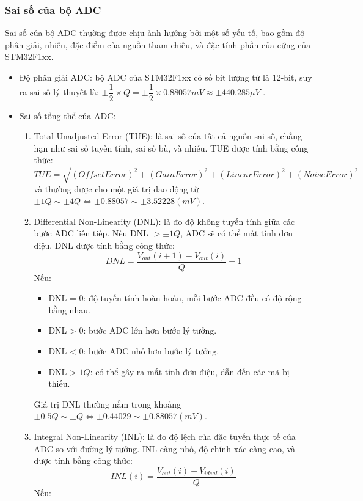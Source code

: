 \subsubsection{Sai số của bộ ADC}

Sai số của bộ ADC thường được chịu ảnh hưởng bởi một số yếu tố, bao gồm độ phân giải, nhiễu, đặc điểm của nguồn tham chiếu, và đặc tính phần của cứng của STM32F1xx.

\begin{itemize}[label=-]
	\item Độ phân giải ADC: bộ ADC của STM32F1xx có số bit lượng tử là 12-bit, suy ra sai số lý thuyết là: $\pm \dfrac{1}{2}\times Q = \pm\dfrac{1}{2}\times 0.88057mV \approx \pm440.285\mu V$ .
	\item Sai số tổng thể của ADC:\\
		\begin{enumerate}[label = \alph*)]
			\item Total Unadjusted Error (TUE): là sai số của tất cả nguồn sai số, chẳng hạn như sai số tuyến tính, sai số bù, và nhiễu. TUE được tính bằng công thức: \[TUE = \sqrt{(OffsetError)^{2} + (GainError)^{2} + (LinearError)^{2} + (NoiseError)^{2}}\]
			và thường được cho một giá trị dao động từ $\pm 1Q \sim \pm 4Q \Leftrightarrow \pm0.88057 \sim \pm 3.52228 (mV)$.
			\item Differential Non-Linearity (DNL): là đo độ không tuyến tính giữa các bước ADC liên tiếp. Nếu DNL $>\pm 1Q$, ADC sẽ có thể mất tính đơn điệu. DNL được tính bằng công thức: \[DNL = \dfrac{V_{out}(i + 1) - V_{out}(i)}{Q} - 1\]
			Nếu:\\
				\begin{itemize}[label = +]
					\item DNL = 0: độ tuyến tính hoàn hoản, mỗi bước ADC đều có độ rộng bằng nhau.
					\item DNL > 0: bước ADC lớn hơn bước lý tưởng.
					\item DNL < 0: bước ADC nhỏ hơn bước lý tưởng.
					\item DNL > $1Q$: có thể gây ra mất tính đơn điệu, dẫn đến các mã bị thiếu.
				\end{itemize}
			Giá trị DNL thường nằm trong khoảng $\pm 0.5Q \sim \pm Q \Leftrightarrow \pm 0.44029 \sim \pm 0.88057 (mV)$.
			\item Integral Non-Linearity (INL): là đo độ lệch của đặc tuyến thực tế của ADC so với đường lý tưởng. INL càng nhỏ, độ chính xác càng cao, và được tính bằng công thức: \[INL(i) = \dfrac{V_{out}(i) - V_{ideal}(i)}{Q}\]
			Nếu:\\

\end{enumerate}
\end{itemize}
